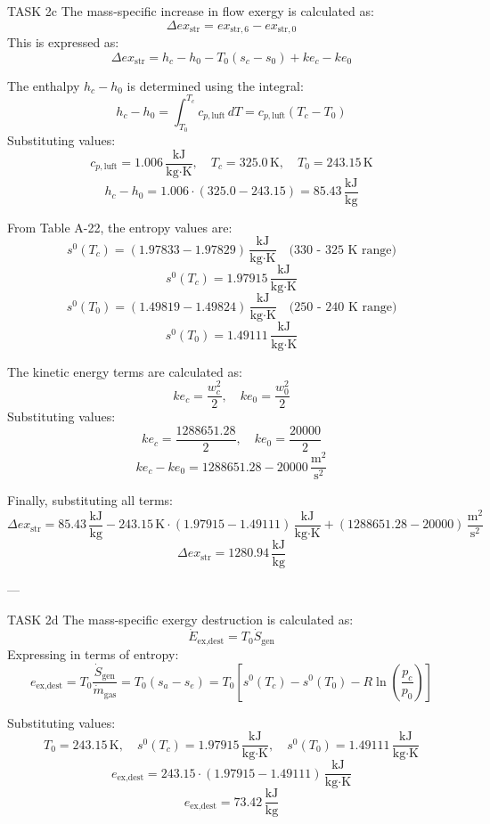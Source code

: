 TASK 2c  
The mass-specific increase in flow exergy is calculated as:  
\[
\Delta ex_{\text{str}} = ex_{\text{str},6} - ex_{\text{str},0}
\]  
This is expressed as:  
\[
\Delta ex_{\text{str}} = h_c - h_0 - T_0 (s_{c} - s_{0}) + ke_c - ke_0
\]  

The enthalpy \( h_c - h_0 \) is determined using the integral:  
\[
h_c - h_0 = \int_{T_0}^{T_c} c_{p,\text{luft}} \, dT = c_{p,\text{luft}} (T_c - T_0)
\]  
Substituting values:  
\[
c_{p,\text{luft}} = 1.006 \, \frac{\text{kJ}}{\text{kg·K}}, \quad T_c = 325.0 \, \text{K}, \quad T_0 = 243.15 \, \text{K}
\]  
\[
h_c - h_0 = 1.006 \cdot (325.0 - 243.15) = 85.43 \, \frac{\text{kJ}}{\text{kg}}
\]  

From Table A-22, the entropy values are:  
\[
s^0(T_c) = (1.97833 - 1.97829) \, \frac{\text{kJ}}{\text{kg·K}} \quad \text{(330 - 325 K range)}
\]  
\[
s^0(T_c) = 1.97915 \, \frac{\text{kJ}}{\text{kg·K}}
\]  
\[
s^0(T_0) = (1.49819 - 1.49824) \, \frac{\text{kJ}}{\text{kg·K}} \quad \text{(250 - 240 K range)}
\]  
\[
s^0(T_0) = 1.49111 \, \frac{\text{kJ}}{\text{kg·K}}
\]  

The kinetic energy terms are calculated as:  
\[
ke_c = \frac{w_c^2}{2}, \quad ke_0 = \frac{w_0^2}{2}
\]  
Substituting values:  
\[
ke_c = \frac{1288651.28}{2}, \quad ke_0 = \frac{20000}{2}
\]  
\[
ke_c - ke_0 = 1288651.28 - 20000 \, \frac{\text{m}^2}{\text{s}^2}
\]  

Finally, substituting all terms:  
\[
\Delta ex_{\text{str}} = 85.43 \, \frac{\text{kJ}}{\text{kg}} - 243.15 \, \text{K} \cdot (1.97915 - 1.49111) \, \frac{\text{kJ}}{\text{kg·K}} + (1288651.28 - 20000) \, \frac{\text{m}^2}{\text{s}^2}
\]  
\[
\Delta ex_{\text{str}} = 1280.94 \, \frac{\text{kJ}}{\text{kg}}
\]  

---

TASK 2d  
The mass-specific exergy destruction is calculated as:  
\[
\dot{E}_{\text{ex,dest}} = T_0 \dot{S}_{\text{gen}}
\]  
Expressing in terms of entropy:  
\[
e_{\text{ex,dest}} = T_0 \frac{\dot{S}_{\text{gen}}}{\dot{m}_{\text{gas}}} = T_0 (s_{a} - s_{e}) = T_0 \left[ s^0(T_c) - s^0(T_0) - R \ln \left( \frac{p_c}{p_0} \right) \right]
\]  

Substituting values:  
\[
T_0 = 243.15 \, \text{K}, \quad s^0(T_c) = 1.97915 \, \frac{\text{kJ}}{\text{kg·K}}, \quad s^0(T_0) = 1.49111 \, \frac{\text{kJ}}{\text{kg·K}}
\]  
\[
e_{\text{ex,dest}} = 243.15 \cdot (1.97915 - 1.49111) \, \frac{\text{kJ}}{\text{kg·K}}
\]  
\[
e_{\text{ex,dest}} = 73.42 \, \frac{\text{kJ}}{\text{kg}}
\]  

